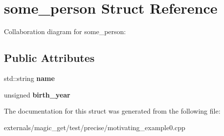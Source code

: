 \hypertarget{structsome__person}{}\section{some\+\_\+person Struct Reference}
\label{structsome__person}


Collaboration diagram for some\+\_\+person\+:
\subsection*{Public Attributes}
\begin{DoxyCompactItemize}
\item 
\mbox{\label{structsome__person_a99f2a0ea166d0375d999161e44635024}} 
std\+::string {\bfseries name}
\item 
\mbox{\label{structsome__person_a8e8b37881335670a4129a95fbef02c8d}} 
unsigned {\bfseries birth\+\_\+year}
\end{DoxyCompactItemize}


The documentation for this struct was generated from the following file\+:\begin{DoxyCompactItemize}
\item 
externals/magic\+\_\+get/test/precise/motivating\+\_\+example0.\+cpp\end{DoxyCompactItemize}
